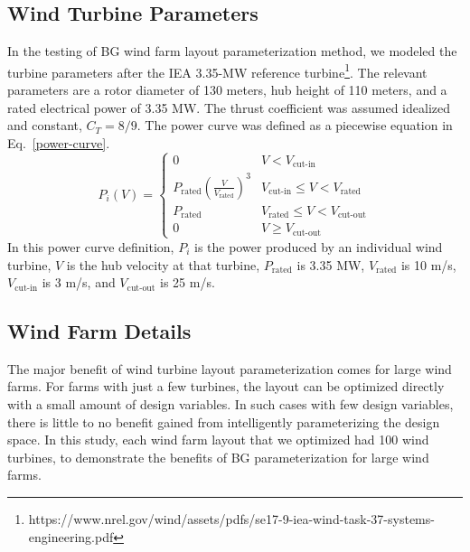 \documentclass[wes, manuscript]{copernicus}
\begin{document}
\subsection{Wind Turbine Parameters}
In the testing of BG wind farm layout parameterization method, we modeled the turbine parameters after the IEA 3.35-MW reference turbine\footnote{https://www.nrel.gov/wind/assets/pdfs/se17-9-iea-wind-task-37-systems-engineering.pdf}. The relevant parameters are a rotor diameter of 130 meters, hub height of 110 meters, and a rated electrical power of 3.35 MW. The thrust coefficient was assumed idealized and constant, $C_T = 8/9$. The power curve was defined as a piecewise equation in Eq.~\ref{power-curve}.
%
\begin{equation}
                P_i(V) = 
                \begin{cases} 
                    0 & V < V_{\text{cut-in}} \\
                    P_{\text{rated}}(\frac{V}{V_{\text{rated}}})^3 & V_{\text{cut-in}}\leq V < V_{\text{rated}} \\
                    P_{\text{rated}} & V_{\text{rated}} \leq V < V_{\text{cut-out}} \\
                    0 & V \geq V_{\text{cut-out}}
                \end{cases}
            \label{power-curve}
\end{equation}
%
In this power curve definition, $P_i$ is the power produced by an individual wind turbine, $V$ is the hub velocity at that turbine, $P_{\text{rated}}$ is 3.35 MW, $V_{\text{rated}}$ is 10 m/s, $V_{\text{cut-in}}$ is 3 m/s, and $V_{\text{cut-out}}$ is 25 m/s.


\subsection{Wind Farm Details}
The major benefit of wind turbine layout parameterization comes for large wind farms. For farms with just a few turbines, the layout can be optimized directly with a small amount of design variables. In such cases with few design variables, there is little to no benefit gained from intelligently parameterizing the design space. In this study, each wind farm layout that we optimized had 100 wind turbines, to demonstrate the benefits of BG parameterization for large wind farms. 
\end{document}
